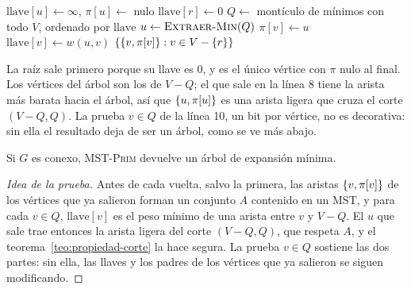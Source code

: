 \documentclass[11pt,letterpaper]{article}
\begin{document}
\begin{algorithm}[H]
\caption{\textsc{MST-Prim}$(G, w, r)$}
\label{alg:mst-prim}
\begin{algorithmic}[1]
    \State $\text{llave}[u] \gets \infty$, \quad $\pi[u] \gets$ nulo
  \EndFor
  \State $\text{llave}[r] \gets 0$
  \State $Q \gets$ montículo de mínimos con todo $V$, ordenado por
         $\text{llave}$
    \State $u \gets \textsc{Extraer-Min}(Q)$
        \State $\pi[v] \gets u$
        \State $\text{llave}[v] \gets w(u, v)$
      \EndIf
    \EndFor
  \EndWhile
  \State \Return $\left\{ \left\{ v, \pi[v] \right\} : v \in V - \left\{ r \right\} \right\}$
\EndProcedure
\end{algorithmic}
\end{algorithm}

La raíz sale primero porque su llave es $0$, y es el único vértice con
$\pi$ nulo al final. Los vértices del árbol son los de $V - Q$; el que
sale en la línea 8 tiene la arista más barata hacia el árbol, así que
$\left\{ u, \pi[u] \right\}$ es una arista ligera que cruza el corte
$(V - Q, Q)$. La prueba $v \in Q$ de la línea 10, un bit por vértice,
no es decorativa: sin ella el resultado deja de ser un árbol, como se
ve más abajo.

\begin{proposicion}
  \label{prop:prim-mst}
  Si $G$ es conexo, \textsc{MST-Prim} devuelve un árbol de expansión
  mínima.
\end{proposicion}

\begin{proof}[Idea de la prueba]
  Antes de cada vuelta, salvo la primera, las aristas
  $\left\{ v, \pi[v] \right\}$ de los vértices que ya salieron forman un conjunto
  $A$ contenido en un MST, y para cada $v \in Q$, $\text{llave}[v]$ es
  el peso mínimo de una arista entre $v$ y $V - Q$. El $u$ que sale
  trae entonces la arista ligera del corte $(V - Q, Q)$, que respeta
  $A$, y el teorema~\ref{teo:propiedad-corte} la hace segura. La
  prueba $v \in Q$ sostiene las dos partes: sin ella, las llaves y los
  padres de los vértices que ya salieron se siguen modificando.
\end{proof}
\end{document}
